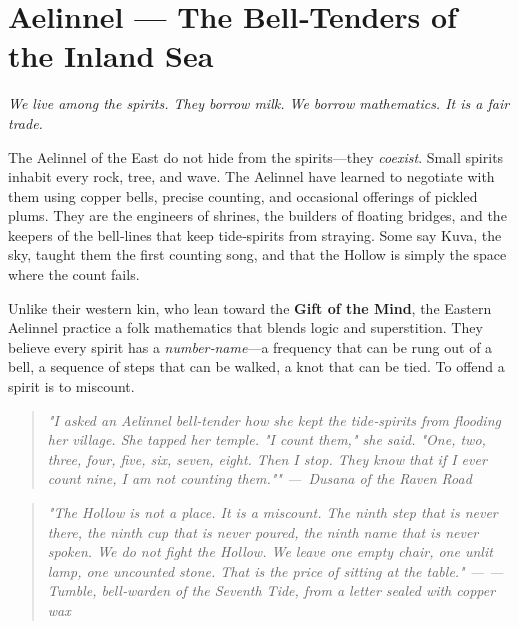 \documentclass[12pt]{book}
\newcommand{\dusana}[1]{%
    \begin{quote}\itshape #1 ---~Dusana of the Raven Road\end{quote}}
\newcommand{\letter}[2]{%
    \begin{quote}\small\itshape #1 \hfill --- #2\end{quote}}
\begin{document}
\section{Aelinnel --- The Bell‑Tenders of the Inland Sea}

\noindent \textit{We live among the spirits. They borrow milk. We borrow mathematics. It is a fair trade.}

The Aelinnel of the East do not hide from the spirits---they \emph{coexist}. Small spirits inhabit every rock, tree, and wave. The Aelinnel have learned to negotiate with them using copper bells, precise counting, and occasional offerings of pickled plums. They are the engineers of shrines, the builders of floating bridges, and the keepers of the bell‑lines that keep tide‑spirits from straying. Some say Kuva, the sky, taught them the first counting song, and that the Hollow is simply the space where the count fails.

Unlike their western kin, who lean toward the \textbf{Gift of the Mind}, the Eastern Aelinnel practice a folk mathematics that blends logic and superstition. They believe every spirit has a \textit{number‑name}---a frequency that can be rung out of a bell, a sequence of steps that can be walked, a knot that can be tied. To offend a spirit is to miscount.

\vspace{0.5em}
\dusana{"I asked an Aelinnel bell‑tender how she kept the tide‑spirits from flooding her village. She tapped her temple. "I count them," she said. "One, two, three, four, five, six, seven, eight. Then I stop. They know that if I ever count nine, I am not counting them.""}

\letter{"The Hollow is not a place. It is a miscount. The ninth step that is never there, the ninth cup that is never poured, the ninth name that is never spoken. We do not fight the Hollow. We leave one empty chair, one unlit lamp, one uncounted stone. That is the price of sitting at the table."}{--- Tumble, bell‑warden of the Seventh Tide, from a letter sealed with copper wax}
\end{document}
